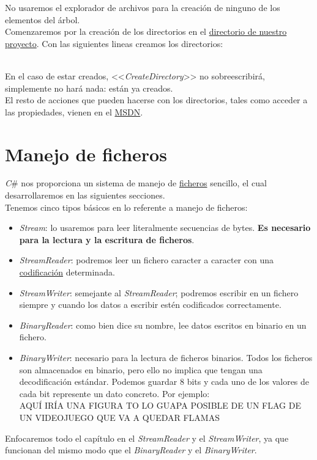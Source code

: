 \documentclass[11pt, oneside]{book}		%
\begin{document}
No usaremos el explorador de archivos para la creación de ninguno de los elementos del árbol.\\
Comenzaremos por la creación de los directorios en el \hypertarget{curdirRet}{\hyperlink{curdirDef}{directorio de nuestro proyecto}}. Con las siguientes lineas creamos los directorios:
\\\\\begin{minipage}[c]{0.95\textwidth}
	
\end{minipage}	
En el caso de estar creados, <<\textit{CreateDirectory}>> no sobreescribirá, simplemente no hará nada: están ya creados.\\
El resto de acciones que pueden hacerse con los directorios, tales como acceder a las propiedades, vienen en el \href{https://docs.microsoft.com/es-es/dotnet/api/system.io.directory?view=netframework-4.8}{MSDN}.
\chapter{Manejo de ficheros}
\textit{C}\# nos proporciona un sistema de manejo de \hypertarget{ficheroRet}{\hyperlink{ficheroDef}{ficheros}}\cite{msdn:fichero} sencillo, el cual desarrollaremos en las siguientes secciones.\\
Tenemos cinco tipos básicos en lo referente a manejo de ficheros:
\begin{itemize}
	\item \textit{Stream}\cite{msdn:stream}: lo usaremos para leer literalmente secuencias de bytes. \textbf{Es necesario para la lectura y la escritura de ficheros}.
	\item \textit{StreamReader}\cite{msdn:streamreader}: podremos leer un fichero caracter a caracter con una \hypertarget{codificacionRet}{\hyperlink{codificacionDef}{codificación}} determinada.
	\item \textit{StreamWriter}\cite{msdn:streamwriter}: semejante al \textit{StreamReader}; podremos escribir en un fichero siempre y cuando los datos a escribir estén codificados correctamente.
	\item \textit{BinaryReader}\cite{msdn:binaryreader}: como bien dice su nombre, lee datos escritos en binario en un fichero.
	\item \textit{BinaryWriter}\cite{msdn:binarywriter}: necesario para la lectura de ficheros binarios. Todos los ficheros son almacenados en binario, pero ello no implica que tengan una decodificación estándar. Podemos guardar 8 bits y cada uno de los valores de cada bit represente un dato concreto. Por ejemplo:
	\\AQUÍ IRÍA UNA FIGURA TO LO GUAPA POSIBLE DE UN FLAG DE UN VIDEOJUEGO QUE VA A QUEDAR FLAMAS
\end{itemize}
Enfocaremos todo el capítulo en el \textit{StreamReader} y el \textit{StreamWriter}, ya que funcionan del mismo modo que el \textit{BinaryReader} y el \textit{BinaryWriter}.
\end{document}
